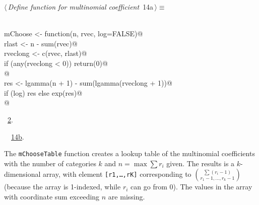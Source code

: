 \documentclass[reqno]{amsart}
\renewcommand{\NWtarget}[2]{\hypertarget{#1}{#2}}
\renewcommand{\NWlink}[2]{\hyperlink{#1}{#2}}
\begin{document}
\begin{flushleft} \small
\begin{minipage}{\linewidth}\label{scrap46}\raggedright\small
\NWtarget{nuweb14a}{} $\langle\,${\itshape Define function for multinomial coefficient}\nobreak\ {\footnotesize {14a}}$\,\rangle\equiv$
\vspace{-1ex}
\begin{list}{}{} \item
\mbox{}\verb@@\\
\mbox{}\verb@    mChoose <- function(n, rvec, log=FALSE){@\\
\mbox{}\verb@      rlast <- n - sum(rvec)@\\
\mbox{}\verb@      rveclong <- c(rvec, rlast)@\\
\mbox{}\verb@      if (any(rveclong < 0)) return(0)@\\
\mbox{}\verb@      @\\
\mbox{}\verb@      res <- lgamma(n + 1) - sum(lgamma(rveclong + 1))@\\
\mbox{}\verb@      if (log) res else exp(res)@\\
\mbox{}\verb@    }@\\
\mbox{}\verb@@{\NWsep}
\end{list}
\vspace{-1.5ex}
\footnotesize
\begin{list}{}{\setlength{\itemsep}{-\parsep}\setlength{\itemindent}{-\leftmargin}}
\item \NWtxtMacroRefIn\ \NWlink{nuweb2}{2}.
\item \NWtxtIdentsDefed\nobreak\  \verb@mChoose@\nobreak\ \NWlink{nuweb14b}{14b}.
\item{}
\end{list}
\end{minipage}\vspace{4ex}
\end{flushleft}
The \texttt{mChooseTable} function creates a lookup table of the multinomial coefficients 
with the number of categories $k$ and $n=\max \sum r_i$ given. The results is a $k$-dimensional array, with element
\texttt{[r1,\ldots,rK]} corresponding to $\binom{\sum (r_i-1)}{r_1-1,\ldots,r_k-1}$ (because the array is 1-indexed, while
$r_i$ can go from 0). The values in the array with coordinate sum exceeding $n$ are missing.
 
\end{document}
